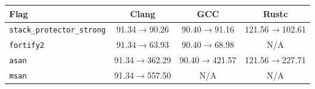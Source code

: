 \begin{tabular*}{\columnwidth}{@{\extracolsep\fill}lccc@{\extracolsep\fill}}
\toprule
\textbf{Flag} & \textbf{Clang} & \textbf{GCC} & \textbf{Rustc} \\
\midrule
\texttt{stack\_protector\_strong} & 91.34$\to$90.26 & 90.40$\to$91.16 & 121.56$\to$102.61 \\
\texttt{fortify2} & 91.34$\to$63.93 & 90.40$\to$68.98 & N/A \\
\texttt{asan} & 91.34$\to$362.29 & 90.40$\to$421.57 & 121.56$\to$227.71 \\
\texttt{msan} & 91.34$\to$557.50 & N/A & N/A \\
\bottomrule
\end{tabular*}
